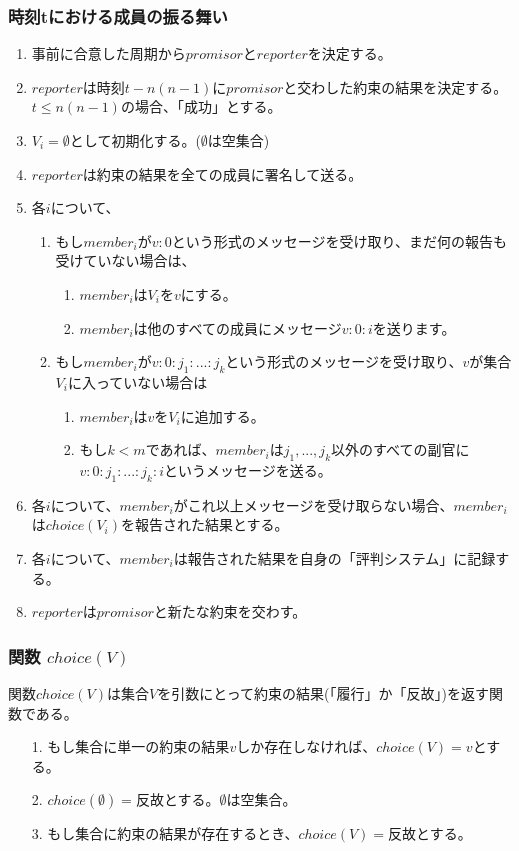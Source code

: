 \subsubsection{時刻tにおける成員の振る舞い}
\begin{enumerate}
  \item 事前に合意した周期から$promisor$と$reporter$を決定する。
  \item $reporter$は時刻$t-n(n-1)$に$promisor$と交わした約束の結果を決定する。$t \leq n(n-1)$の場合、「成功」とする。
  \item $V_i=\emptyset$として初期化する。($\emptyset$は空集合)
  \item $reporter$は約束の結果を全ての成員に署名して送る。
  \item 各$i$について、 
  \begin{enumerate}
    \item もし$member_i$が$v:0$という形式のメッセージを受け取り、まだ何の報告も受けていない場合は、
    \begin{enumerate}
      \item $member_i$は$ V_i$を${v}$にする。 
      \item $member_i$は他のすべての成員にメッセージ$v:0:i$を送ります。
    \end{enumerate}
    \item もし$member_i$が$v:0:j_1:...:j_k$という形式のメッセージを受け取り、$v$が集合$V_i$に入っていない場合は
    \begin{enumerate}
      \item $member_i$は$v$を$V_i$に追加する。
      \item もし$k<m$であれば、$member_i$は$j_1, ..., j_k$以外のすべての副官に$v:0:j_1:...:j_k:i$というメッセージを送る。
    \end{enumerate}
  \end{enumerate}
  \item 各$i$について、$member_i$がこれ以上メッセージを受け取らない場合、$member_i$は$choice(V_i)$を報告された結果とする。
  \item 各$i$について、$member_i$は報告された結果を自身の「評判システム」に記録する。
  \item $reporter$は$promisor$と新たな約束を交わす。
\end{enumerate}

\subsubsection{関数 $choice(V)$}
関数$choice(V)$は集合$V$を引数にとって約束の結果(「履行」か「反故」)を返す関数である。
\begin{enumerate}
  \item[1.] もし集合に単一の約束の結果$v$しか存在しなければ、$choice(V) = v$とする。
  \item[2.] $choice(\emptyset) = 反故$とする。$\emptyset$は空集合。
  \item[3.] もし集合に約束の結果が存在するとき、$choice(V) = 反故$とする。
\end{enumerate}

